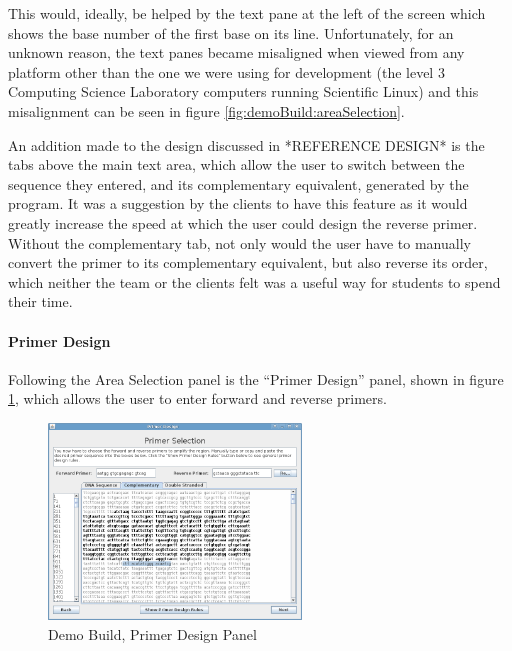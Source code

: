 This would, ideally, be helped by the text pane at the left of the
screen which shows the base number of the first base on its line.
Unfortunately, for an unknown reason, the text panes became misaligned
when viewed from any platform other than the one we were using for
development (the level 3 Computing Science Laboratory computers
running Scientific Linux) and this misalignment can be seen in figure
\ref{fig:demoBuild:areaSelection}.

An addition made to the design discussed in *REFERENCE DESIGN* is the
tabs above the main text area, which allow the user to switch between
the sequence they entered, and its complementary equivalent, generated
by the program.
It was a suggestion by the clients to have this feature as it would
greatly increase the speed at which the user could design the reverse
primer.
Without the complementary tab, not only would the user have to
manually convert the primer to its complementary equivalent, but also
reverse its order, which neither the team or the clients felt was a
useful way for students to spend their time. 


\paragraph{Primer Design}

Following the Area Selection panel is the ``Primer Design'' panel,
shown in figure \ref{fig:demoBuild:primerDesign}, which allows the
user to enter forward and reverse primers.

\begin{figure}[h]
  \begin{center}
    \includegraphics[width=0.6\textwidth]{./images/demoBuild/primerDesign.png}
    \caption{
      \label{fig:demoBuild:primerDesign}
      Demo Build, Primer Design Panel
    }
  \end{center}
\end{figure}

